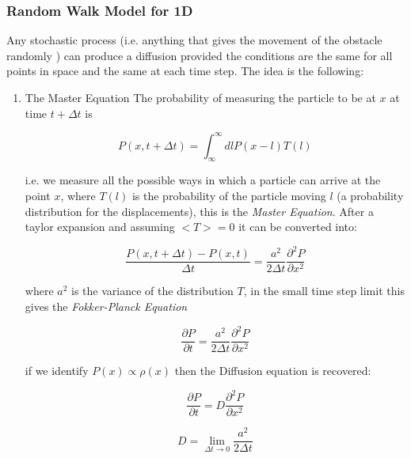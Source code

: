 \documentclass[11pt]{article}
\begin{document}
\subsubsection{Random Walk Model for 1D}
\label{sec:org57233d5}
Any stochastic process (i.e. anything that gives the movement of the obstacle randomly ) can produce a diffusion provided the conditions are the same for all points in space and the same at each time step. The idea is the following:
\begin{enumerate}
\item The Master Equation
\label{sec:org7cbff99}
The probability of measuring the particle to be at \(x\) at time \(t + \Delta t\) is

$$P(x, t+\Delta t) =\int_{\infty}^{\infty} {dlP(x-l)T(l)}$$

i.e. we measure all the possible ways in which a particle can arrive at the point \(x\), where \(T(l)\) is the probability of the particle
moving \(l\) (a probability distribution for the displacements), this is the \emph{Master Equation}. After a taylor expansion
and assuming \(<T>=0\) it can be converted into:

$$\frac{P(x,t+\Delta t) - P(x,t)}{\Delta t} = \frac{a^2}{2\Delta t}\frac{\partial^2 P}{\partial x^2}$$

where \(a^2\) is the variance of the distribution \(T\), in the small time step limit this gives the \emph{Fokker-Planck Equation}

$$\frac{\partial P}{\partial t} = \frac{a^2}{2\Delta t}\frac{\partial^2 P}{\partial x^2}$$

if we identify \(P(x) \propto \rho(x)\) then the Diffusion equation is recovered:

$$\frac{\partial P}{\partial t} = D\frac{\partial^2 P}{\partial x^2}$$

$$D = \lim_{\Delta t\to 0}\frac{a^2}{2\Delta t}$$
\end{enumerate}
\end{document}
